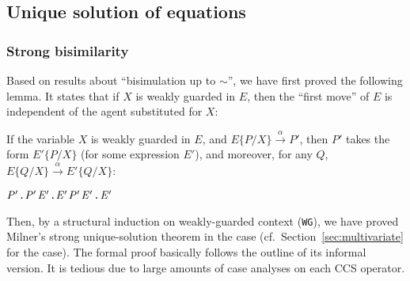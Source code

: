 
\subsection{Unique solution of equations}
\label{ss:part2}

\subsubsection{Strong bisimilarity}

Based on results about ``bisimulation up to $\sim$'', we have first proved the following
 lemma. It states  that if $X$ is weakly guarded
in $E$, then the ``first move'' of $E$ is independent of the agent
substituted for $X$:
\begin{lemma}
\label{lem:313}
If the variable $X$ is weakly guarded in $E$, and
$E\{P/X\}\overset{\alpha}{\rightarrow} P'$, then $P'$ takes the form
$E'\{P/X\}$ (for some expression $E'$), and moreover, for any $Q$,
$E\{Q/X\}\overset{\alpha}{\rightarrow} E'\{Q/X\}$:
\begin{alltt}
\HOLTokenTurnstile{}   \HOLSymConst{\HOLTokenImp{}}
   \HOLSymConst{\HOLTokenForall{}}  \ensuremath{\HOLBoundVar{P}\sp{\prime}}.   \HOLTokenTransBegin{}\HOLTokenTransEnd \ensuremath{\HOLBoundVar{P}\sp{\prime}} \HOLSymConst{\HOLTokenImp{}} \HOLSymConst{\HOLTokenExists{}}\ensuremath{\HOLBoundVar{E}\sp{\prime}}.  \ensuremath{\HOLBoundVar{E}\sp{\prime}} \HOLSymConst{\HOLTokenConj{}} \ensuremath{\HOLBoundVar{P}\sp{\prime}} \HOLSymConst{\ensuremath{=}} \ensuremath{\HOLBoundVar{E}\sp{\prime}}  \HOLSymConst{\HOLTokenConj{}} \HOLSymConst{\HOLTokenForall{}}.   \HOLTokenTransBegin{}\HOLTokenTransEnd \ensuremath{\HOLBoundVar{E}\sp{\prime}} 
\end{alltt}
\end{lemma}

Then, by a structural induction on weakly-guarded context
(\texttt{WG}), we have proved Milner's strong unique-solution theorem
in the \univariate case (cf.~Section~\ref{sec:multivariate} for the
\multivariate case). The formal proof basically follows the outline of its
informal version. It is tedious due to large amounts of case analyses
on each CCS operator.

